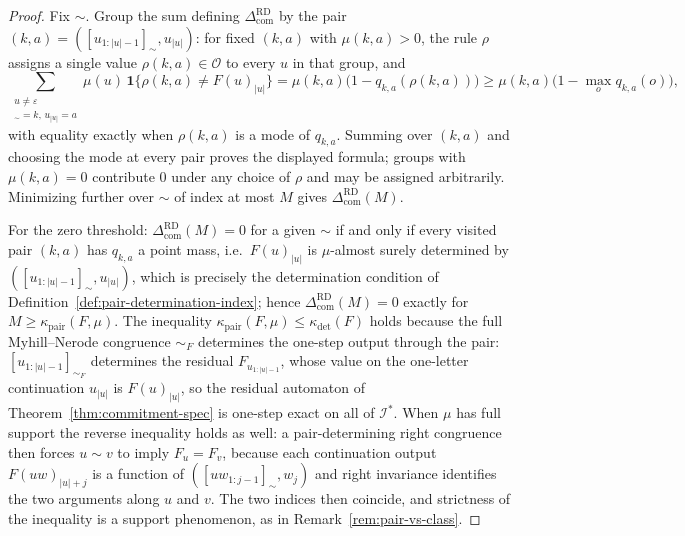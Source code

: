 \documentclass[12pt]{article}
\theoremstyle{definition}
\newcommand{\ComRD}{\Delta_{\mathrm{com}}^{\mathrm{RD}}}
\begin{document}
\begin{proof}
Fix $\sim$.  Group the sum defining $\ComRD$ by the pair
$(k,a)=([u_{1:|u|-1}]_\sim,u_{|u|})$: for fixed $(k,a)$ with $\mu(k,a)>0$, the
rule $\rho$ assigns a single value $\rho(k,a)\in\mathcal O$ to every $u$ in
that group, and
\[
\sum_{\substack{u\ne\varepsilon\\ [u_{1:|u|-1}]_\sim=k,\,u_{|u|}=a}}
\mu(u)\,\mathbf 1\{\rho(k,a)\ne F(u)_{|u|}\}
=
\mu(k,a)\bigl(1-q_{k,a}(\rho(k,a))\bigr)
\ge
\mu(k,a)\bigl(1-\max_oq_{k,a}(o)\bigr),
\]
with equality exactly when $\rho(k,a)$ is a mode of $q_{k,a}$.  Summing over
$(k,a)$ and choosing the mode at every pair proves the displayed formula;
groups with $\mu(k,a)=0$ contribute $0$ under any choice of $\rho$ and may be
assigned arbitrarily.  Minimizing further over $\sim$ of index at most $M$
gives $\ComRD(M)$.

For the zero threshold: $\ComRD(M)=0$ for a given $\sim$ if and only if every
visited pair $(k,a)$ has $q_{k,a}$ a point mass, i.e.\ $F(u)_{|u|}$ is
$\mu$-almost surely determined by $([u_{1:|u|-1}]_\sim,u_{|u|})$, which is
precisely the determination condition of Definition~\ref{def:pair-determination-index};
hence $\ComRD(M)=0$ exactly for $M\ge\kappa_{\mathrm{pair}}(F,\mu)$.  The
inequality $\kappa_{\mathrm{pair}}(F,\mu)\le\kappa_{\det}(F)$ holds because
the full Myhill--Nerode congruence $\sim_F$ determines the one-step output
through the pair: $[u_{1:|u|-1}]_{\sim_F}$ determines the residual
$F_{u_{1:|u|-1}}$, whose value on the one-letter continuation $u_{|u|}$ is
$F(u)_{|u|}$, so the residual automaton of Theorem~\ref{thm:commitment-spec}
is one-step exact on all of $\mathcal I^*$.  When $\mu$ has full support the
reverse inequality holds as well: a pair-determining right congruence then
forces $u\sim v$ to imply $F_u=F_v$, because each continuation output
$F(uw)_{|u|+j}$ is a function of $([uw_{1:j-1}]_\sim,w_j)$ and right
invariance identifies the two arguments along $u$ and $v$.  The two indices
then coincide, and strictness of the inequality is a support phenomenon, as
in Remark~\ref{rem:pair-vs-class}.
\end{proof}
\end{document}
